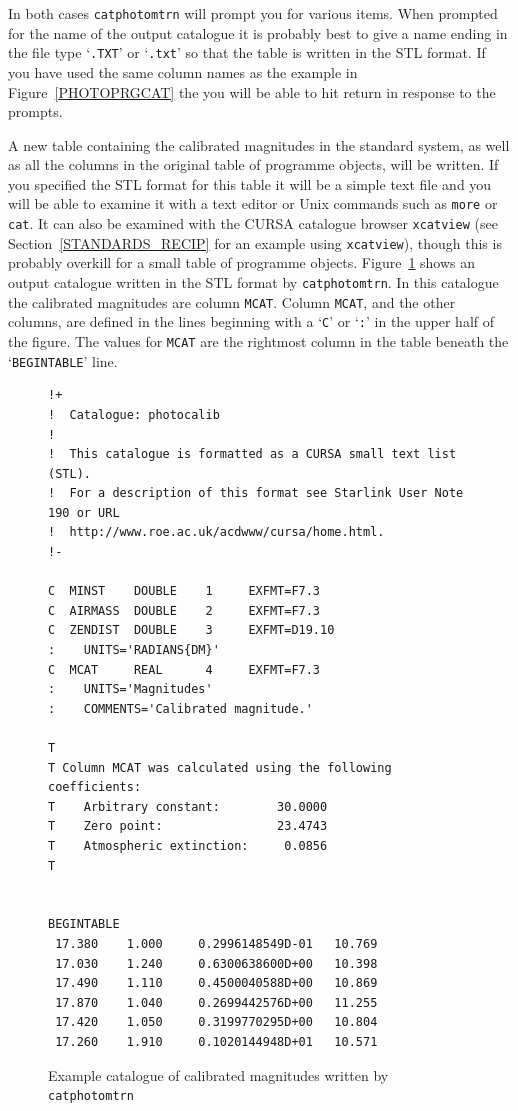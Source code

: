 \documentclass[twoside,11pt]{article}
\newcommand{\xref}[3]{#1}
\begin{document}
\begin{enumerate}
   In both cases \xref{{\tt catphotomtrn}}{sun190}{CATPHOTOMTRN} will
   prompt you for various items.  When prompted for the name of the
   output catalogue it is probably best to give a name ending in the file
   type `{\tt .TXT}' or `{\tt .txt}' so that the table is written in the
   STL format.  If you have used the same column names as the example in
   Figure~\ref{PHOTOPRGCAT} the you will be able to hit return in response
   to the prompts.

   A new table containing the calibrated magnitudes in the standard
   system, as well as all the columns in the original table of
   programme objects, will be written.  If you specified the STL
   format for this table it will be a simple text file and you will
   be able to examine it with a text editor or Unix commands such
   as {\tt more} or {\tt cat}.  It can also be examined with the
   CURSA catalogue browser {\tt xcatview} (see
   Section~\ref{STANDARDS_RECIP} for an example using {\tt xcatview}),
   though this is probably overkill for a small table of programme
   objects.  Figure~\ref{PHOTOPRGOUT} shows an output catalogue written
   in the STL format by {\tt catphotomtrn}.  In this catalogue the
   calibrated magnitudes are column {\tt MCAT}.  Column {\tt MCAT},
   and the other columns, are defined in the lines beginning with a
   `{\tt C}' or `{\tt :}' in the upper half of the figure.  The values
   for {\tt MCAT} are the rightmost column in the table beneath the
   `{\tt BEGINTABLE}' line.

\begin{figure}[htbp]

\begin{verbatim}
!+
!  Catalogue: photocalib
!
!  This catalogue is formatted as a CURSA small text list (STL).
!  For a description of this format see Starlink User Note 190 or URL
!  http://www.roe.ac.uk/acdwww/cursa/home.html.
!-

C  MINST    DOUBLE    1     EXFMT=F7.3
C  AIRMASS  DOUBLE    2     EXFMT=F7.3
C  ZENDIST  DOUBLE    3     EXFMT=D19.10
:    UNITS='RADIANS{DM}'
C  MCAT     REAL      4     EXFMT=F7.3
:    UNITS='Magnitudes'
:    COMMENTS='Calibrated magnitude.'

T  
T Column MCAT was calculated using the following coefficients:
T    Arbitrary constant:        30.0000
T    Zero point:                23.4743
T    Atmospheric extinction:     0.0856
T  


BEGINTABLE
 17.380    1.000     0.2996148549D-01   10.769
 17.030    1.240     0.6300638600D+00   10.398
 17.490    1.110     0.4500040588D+00   10.869
 17.870    1.040     0.2699442576D+00   11.255
 17.420    1.050     0.3199770295D+00   10.804
 17.260    1.910     0.1020144948D+01   10.571
\end{verbatim}

\begin{quote}
\caption{Example catalogue of calibrated magnitudes written by
{\tt catphotomtrn}
\label{PHOTOPRGOUT} }
\end{quote}

\end{figure}


\end{enumerate}
\end{document}
